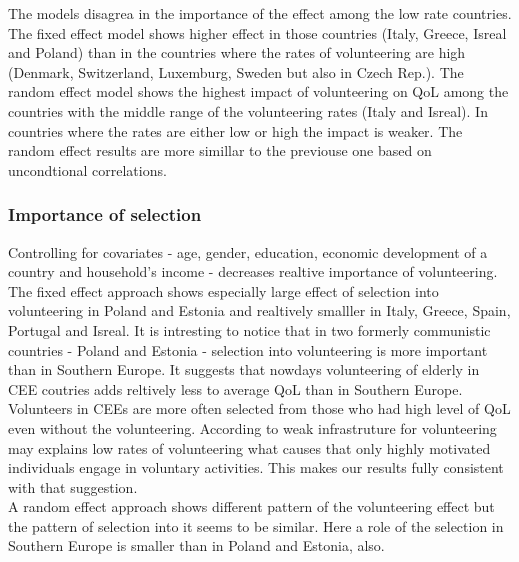 \documentclass[10pt, letterpaper]{article}
\begin{document}
\begin{spacing}{1.4}
The models disagrea in the importance of the effect among the low rate countries. The fixed effect model shows higher effect in those countries (Italy, Greece, Isreal and Poland) than in the countries where the rates of volunteering are high (Denmark, Switzerland, Luxemburg, Sweden but also in Czech Rep.). The random effect model shows the highest impact of volunteering on QoL among the countries with the middle range of the volunteering rates (Italy and Isreal). In countries where the rates are either low or high the impact is weaker. The random effect results are more simillar to the previouse one based on uncondtional correlations.  \\

\subsubsection*{Importance of selection}

Controlling for covariates - age, gender, education, economic development of a country and household's income - decreases realtive importance of volunteering. The fixed effect approach shows especially large effect of selection into volunteering in Poland and Estonia and realtively smalller in Italy, Greece, Spain, Portugal and Isreal. It is intresting to notice that in two formerly communistic countries - Poland and Estonia - selection into volunteering is more important than in Southern Europe. It suggests that nowdays volunteering  of elderly in CEE coutries adds reltively less to average QoL  than in Southern Europe. Volunteers in CEEs are more often selected from those who had high level of QoL even without the  volunteering. According to \citet{plagnol10} weak infrastruture for volunteering may explains low rates of volunteering what causes that only highly motivated individuals engage in voluntary activities. This makes our results fully consistent with that suggestion.  \\ 

A random effect approach shows different pattern of the volunteering effect but the pattern of selection into it seems to be similar. Here a role of the selection in Southern Europe is smaller than in Poland and Estonia, also. \\

   

\end{spacing}
\end{document}
